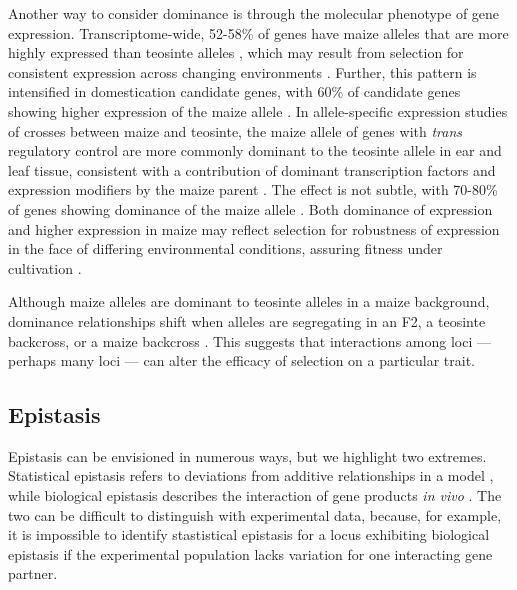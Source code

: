 \documentclass[9pt,twocolumn,twoside]{rilabRxiv}
\newcommand{\jri}[1]{{\small \textcolor{red}{#1}}}
\begin{document}
﻿Another way to consider dominance is through the molecular phenotype of gene expression.
Transcriptome-wide, 52-58\% of genes have maize alleles that are more highly expressed than teosinte alleles \citep{hufford2012natgen, swansonwagner2012, lemmon2014eqtl, wang2017}, which may result from selection for consistent expression across changing environments \citep{doebley1995, lorant2017}.
Further, this pattern is intensified in domestication candidate genes, with 60\% of candidate genes showing higher expression of the maize allele \citep{hufford2012natgen, swansonwagner2012}.
﻿In allele-specific expression studies of crosses between maize and teosinte, the maize allele of genes with \textit{trans} regulatory control are more commonly dominant to the teosinte allele in ear and leaf tissue,  %
consistent with a contribution of dominant transcription factors and expression modifiers by the maize parent \citep{lemmon2014eqtl}.
The effect is not subtle, with 70-80\% of genes showing dominance of the maize allele \citep{lemmon2014eqtl}.
Both dominance of expression and higher expression in maize may reflect selection for robustness of expression in the face of differing environmental conditions, assuring fitness under cultivation \citep{doebley1995}.

﻿Although maize alleles are dominant to teosinte alleles in a maize background, dominance relationships shift when alleles are segregating in an F2, a teosinte backcross, or a maize backcross \citep{doebley1995, briggs2007, doust2014}.
This suggests that interactions among loci --- perhaps many loci --- can alter the efficacy of selection on a particular trait.

\subsection*{Epistasis}

﻿Epistasis can be envisioned in numerous ways, but we highlight two extremes.
Statistical epistasis refers to deviations from additive relationships in a model \citep{fisher1918}, while biological epistasis describes the interaction of gene products \textit{in vivo} \citep{bateson1909}.
﻿The two can be difficult to distinguish with experimental data, because, for example, it is impossible to identify stastistical epistasis for a locus exhibiting biological epistasis if the experimental population lacks variation for one interacting gene partner.
\end{document}
